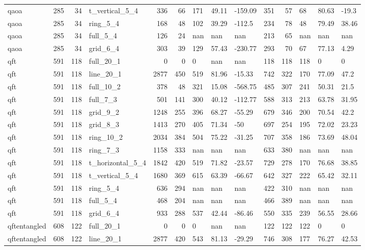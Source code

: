 \begin{longtable}{lrrlrrlllrrlll}
qaoa & 285 & 34 & t\_vertical\_5\_4 & 336 & 66 & 171 & 49.11 & -159.09 & 351 & 57 & 68 & 80.63 & -19.3 \\
qaoa & 285 & 34 & ring\_5\_4 & 168 & 48 & 102 & 39.29 & -112.5 & 234 & 78 & 48 & 79.49 & 38.46 \\
qaoa & 285 & 34 & full\_5\_4 & 126 & 24 & nan & nan & nan & 213 & 65 & nan & nan & nan \\
qaoa & 285 & 34 & grid\_6\_4 & 303 & 39 & 129 & 57.43 & -230.77 & 293 & 70 & 67 & 77.13 & 4.29 \\
qft & 591 & 118 & full\_20\_1 & 0 & 0 & 0 & nan & nan & 118 & 118 & 118 & 0 & 0 \\
qft & 591 & 118 & line\_20\_1 & 2877 & 450 & 519 & 81.96 & -15.33 & 742 & 322 & 170 & 77.09 & 47.2 \\
qft & 591 & 118 & full\_10\_2 & 378 & 48 & 321 & 15.08 & -568.75 & 485 & 307 & 241 & 50.31 & 21.5 \\
qft & 591 & 118 & full\_7\_3 & 501 & 141 & 300 & 40.12 & -112.77 & 588 & 313 & 213 & 63.78 & 31.95 \\
qft & 591 & 118 & grid\_9\_2 & 1248 & 255 & 396 & 68.27 & -55.29 & 679 & 346 & 200 & 70.54 & 42.2 \\
qft & 591 & 118 & grid\_8\_3 & 1413 & 270 & 405 & 71.34 & -50 & 697 & 254 & 195 & 72.02 & 23.23 \\
qft & 591 & 118 & ring\_10\_2 & 2034 & 384 & 504 & 75.22 & -31.25 & 707 & 358 & 186 & 73.69 & 48.04 \\
qft & 591 & 118 & ring\_7\_3 & 1158 & 333 & nan & nan & nan & 633 & 380 & nan & nan & nan \\
qft & 591 & 118 & t\_horizontal\_5\_4 & 1842 & 420 & 519 & 71.82 & -23.57 & 729 & 278 & 170 & 76.68 & 38.85 \\
qft & 591 & 118 & t\_vertical\_5\_4 & 1680 & 369 & 615 & 63.39 & -66.67 & 642 & 327 & 222 & 65.42 & 32.11 \\
qft & 591 & 118 & ring\_5\_4 & 636 & 294 & nan & nan & nan & 422 & 310 & nan & nan & nan \\
qft & 591 & 118 & full\_5\_4 & 468 & 204 & nan & nan & nan & 466 & 389 & nan & nan & nan \\
qft & 591 & 118 & grid\_6\_4 & 933 & 288 & 537 & 42.44 & -86.46 & 550 & 335 & 239 & 56.55 & 28.66 \\
qftentangled & 608 & 122 & full\_20\_1 & 0 & 0 & 0 & nan & nan & 122 & 122 & 122 & 0 & 0 \\
qftentangled & 608 & 122 & line\_20\_1 & 2877 & 420 & 543 & 81.13 & -29.29 & 746 & 308 & 177 & 76.27 & 42.53 \\

\end{longtable}

